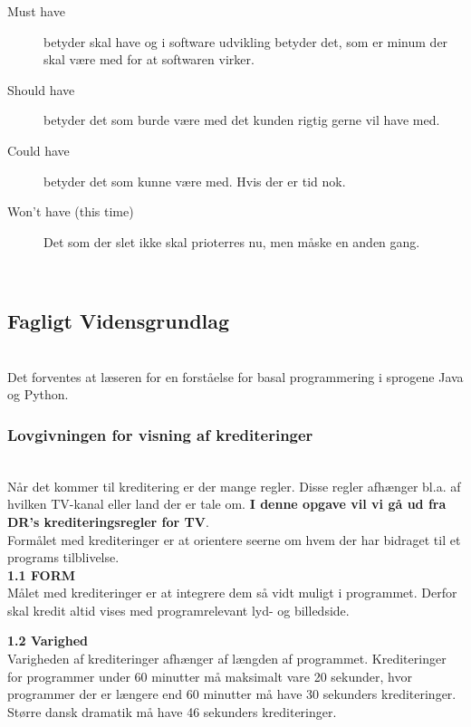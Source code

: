 \begin{description}
    \item [Must have] betyder skal have og i software udvikling betyder det, som er minum der skal være med for at softwaren virker. 
    \item [Should have] betyder det som burde være med det kunden rigtig gerne vil have med.
    \item [Could have] betyder det som kunne være med. Hvis der er tid nok. 
    \item [Won't have (this time)] Det som der slet ikke skal prioterres nu, men måske en anden gang. 
\end{description}  \\

\subsection{Fagligt Vidensgrundlag} \\
Det forventes at læseren for en forståelse for basal programmering i sprogene Java og Python.

\subsubsection{Lovgivningen for visning af krediteringer}
 \\
Når det kommer til kreditering er der mange regler. Disse regler afhænger bl.a. af hvilken TV-kanal eller land der er tale om. \textbf{I denne opgave vil vi gå ud fra DR's krediteringsregler for TV}. \\

Formålet med krediteringer er at orientere seerne om hvem der har bidraget til et programs tilblivelse. \\

\textbf{1.1 FORM} \\
Målet med krediteringer er at integrere dem så vidt muligt i programmet. Derfor skal kredit altid vises med programrelevant lyd- og billedside.

\textbf{1.2 Varighed} \\
Varigheden af krediteringer afhænger af længden af programmet. Krediteringer for programmer under 60 minutter må maksimalt vare 20 sekunder, hvor programmer der er længere end 60 minutter må have 30 sekunders krediteringer. Større dansk dramatik må have 46 sekunders krediteringer. \\

